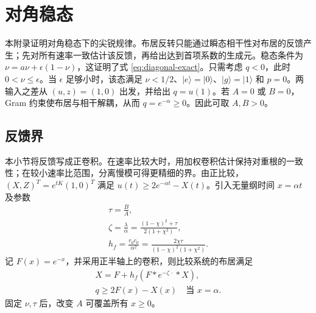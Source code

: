 \documentclass[aps,pra,reprint,amsmath,amssymb,nofootinbib,floatfix,longbibliography]{revtex4-2}
\theoremstyle{aps}
\newcommand{\eps}{\epsilon}
\newcommand{\ket}[1]{|#1\rangle}
\begin{document}
\section{对角稳态}\label{app:diagonal}

本附录证明对角稳态下的尖锐规律。布居反转只能通过瞬态相干性对布居的反馈产生；先对所有速率一致估计该反馈，再给出达到首项系数的生成元。稳态条件为
$\nu=a\nu+\eps(1-\nu)$，这证明了式 \eqref{eq:diagonal-exact}。只需考虑 $q<0$，此时 $0<\nu\le\eps$。当 $\eps$ 足够小时，该态满足 $\nu<1/2$、$\ket e=\ket0$、$\ket g=\ket1$ 和 $p=0$。两输入之差从 $(u,z)=(1,0)$ 出发，并给出 $q=u(1)$。若 $A=0$ 或 $B=0$，Gram 约束使布居与相干解耦，从而 $q=e^{-\alpha}\ge0$。因此可取 $A,B>0$。

\subsection{反馈界}

本小节将反馈写成正卷积。在速率比较大时，用加权卷积估计保持对重根的一致性；在较小速率比范围，分离慢模可得更精细的界。由正比较，$(X,Z)^T=e^{tK}(1,0)^T$ 满足 $u(t)\ge2e^{-\alpha t}-X(t)$。引入无量纲时间 $x=\alpha t$ 及参数
\begin{equation}\label{eq:diag-parameters}
 \begin{gathered}
 \tau=\frac BA,\\
 \zeta=\frac\lambda\alpha
 =\frac{(1-\chi)^2+\tau}{2(1+\chi^2)},\\
 h_f=\frac{r_0c_0}{\alpha^2}
 =\frac{2\chi\tau}{(1-\chi)^2(1+\chi^2)}.
 \end{gathered}
\end{equation}
记 $F(x)=e^{-x}$，并采用正半轴上的卷积，则比较系统的布居满足
\begin{equation}\label{eq:volterra}
 \begin{gathered}
 X=F+h_f(F*e^{-\zeta\,\cdot}*X),\\
 q\ge2F(x)-X(x)\quad\text{当 }x=\alpha.
 \end{gathered}
\end{equation}
固定 $\nu,\tau$ 后，改变 $A$ 可覆盖所有 $x\ge0$。
\end{document}
